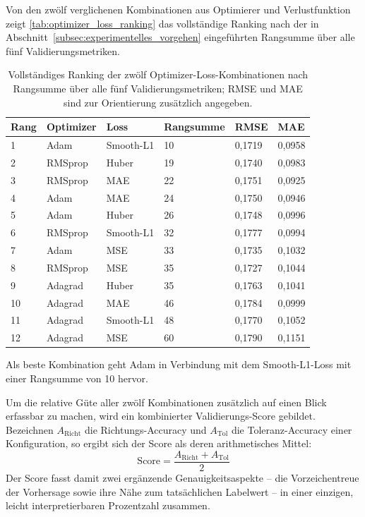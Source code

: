 Von den zwölf verglichenen Kombinationen aus Optimierer und Verlustfunktion zeigt \autoref{tab:optimizer_loss_ranking} das vollständige Ranking nach der in Abschnitt~\ref{subsec:experimentelles_vorgehen} eingeführten Rangsumme über alle fünf Validierungsmetriken.

\begin{table}[h]
    \centering
    \small
    \caption[Ranking der Optimizer-Loss-Kombinationen]{Vollständiges Ranking der zwölf Optimizer-Loss-Kombinationen nach Rangsumme über alle fünf Validierungsmetriken; RMSE und MAE sind zur Orientierung zusätzlich angegeben.}
    \label{tab:optimizer_loss_ranking}
    \begin{tabularx}{\textwidth}{@{} l X X X X X @{}}
        \toprule
        \textbf{Rang} & \textbf{Optimizer} & \textbf{Loss} & \textbf{Rangsumme} & \textbf{RMSE} & \textbf{MAE} \\
        \midrule
        1  & Adam     & Smooth-L1 & 10 & 0,1719 & 0,0958 \\
        2  & RMSprop  & Huber     & 19 & 0,1740 & 0,0983 \\
        3  & RMSprop  & MAE       & 22 & 0,1751 & 0,0925 \\
        4  & Adam     & MAE       & 24 & 0,1750 & 0,0946 \\
        5  & Adam     & Huber     & 26 & 0,1748 & 0,0996 \\
        6  & RMSprop  & Smooth-L1 & 32 & 0,1777 & 0,0994 \\
        7  & Adam     & MSE       & 33 & 0,1735 & 0,1032 \\
        8  & RMSprop  & MSE       & 35 & 0,1727 & 0,1044 \\
        9  & Adagrad  & Huber     & 35 & 0,1763 & 0,1041 \\
        10 & Adagrad  & MAE       & 46 & 0,1784 & 0,0999 \\
        11 & Adagrad  & Smooth-L1 & 48 & 0,1770 & 0,1052 \\
        12 & Adagrad  & MSE       & 60 & 0,1790 & 0,1151 \\
        \bottomrule
    \end{tabularx}
\end{table}

Als beste Kombination geht \gls{Adam} in Verbindung mit dem Smooth-L1-Loss mit einer Rangsumme von 10 hervor.

Um die relative Güte aller zwölf Kombinationen zusätzlich auf einen Blick erfassbar zu machen, wird ein kombinierter Validierungs-Score gebildet. Bezeichnen $A_{\text{Richt}}$ die Richtungs-Accuracy und $A_{\text{Tol}}$ die Toleranz-Accuracy einer Konfiguration, so ergibt sich der Score als deren arithmetisches Mittel:
\begin{equation}
    \text{Score} = \frac{A_{\text{Richt}} + A_{\text{Tol}}}{2}
    \label{eq:val_score}
\end{equation}
Der Score fasst damit zwei ergänzende Genauigkeitsaspekte -- die Vorzeichentreue der Vorhersage sowie ihre Nähe zum tatsächlichen Labelwert -- in einer einzigen, leicht interpretierbaren Prozentzahl zusammen.

